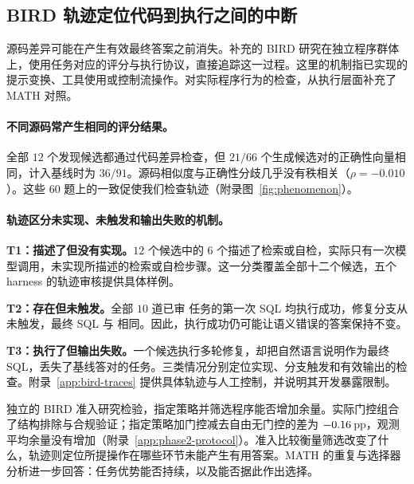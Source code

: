 \subsection{BIRD 轨迹定位代码到执行之间的中断}\label{sec:supporting}\label{sec:f1-collapse}
源码差异可能在产生有效最终答案之前消失。补充的 BIRD 研究在独立程序群体上，使用任务对应的评分与执行协议，直接追踪这一过程。这里的机制指已实现的提示变换、工具使用或控制流操作。对实际程序行为的检查，从执行层面补充了 MATH 对照。

\paragraph{不同源码常产生相同的评分结果。}
全部 $12$ 个发现候选都通过代码差异检查，但 $21/66$ 个生成候选对的正确性向量相同，计入基线时为 $36/91$。源码相似度与正确性分歧几乎没有秩相关（$\rho=-0.010$）。这些 $60$ 题上的一致促使我们检查轨迹（附录图~\ref{fig:phenomenon}）。

\paragraph{轨迹区分未实现、未触发和输出失败的机制。}
\textbf{T1：描述了但没有实现。}$12$ 个候选中的 $6$ 个描述了检索或自检，实际只有一次模型调用，未实现所描述的检索或自检步骤。这一分类覆盖全部十二个候选，五个 harness 的轨迹审核提供具体样例。

\textbf{T2：存在但未触发。}全部 $10$ 道已审 \react{} 任务的第一次 SQL 均执行成功，修复分支从未触发，最终 SQL 与 \bare{} 相同。因此，执行成功仍可能让语义错误的答案保持不变。

\textbf{T3：执行了但输出失败。}一个候选执行多轮修复，却把自然语言说明作为最终 SQL，丢失了基线答对的任务。三类情况分别定位实现、分支触发和有效输出的检查。附录~\ref{app:bird-traces} 提供具体轨迹与人工控制，并说明其开发暴露限制。

独立的 BIRD 准入研究检验，指定策略并筛选程序能否增加余量。实际门控组合了结构排除与合规验证；指定策略加门控减去自由无门控的差为 $-0.16$\,pp，观测平均余量没有增加（附录~\ref{app:phase2-protocol}）。准入比较衡量筛选改变了什么，轨迹则定位所提操作在哪些环节未能产生有用答案。MATH 的重复与选择器分析进一步回答：任务优势能否持续，以及能否据此作出选择。
